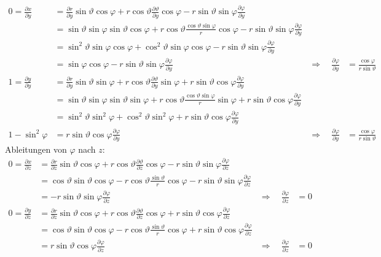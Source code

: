 \begin{align*}
0=\frac{\partial x}{\partial y}
&=
\frac{\partial r}{\partial y}
\sin\vartheta\cos\varphi
+
r\cos\vartheta
\frac{\partial\vartheta}{\partial y}
\cos\varphi
-
r\sin\vartheta\sin\varphi
\frac{\partial\varphi}{\partial y}
\\
&=
\sin\vartheta\sin\varphi
\sin\vartheta\cos\varphi
+
r\cos\vartheta
\frac{\cos\vartheta\sin\varphi}{r}
\cos\varphi
-
r\sin\vartheta\sin\varphi
\frac{\partial\varphi}{\partial y}
\\
&=
\sin^2\vartheta \sin\varphi \cos\varphi
+
\cos^2\vartheta \sin\varphi \cos\varphi
-
r\sin\vartheta\sin\varphi
\frac{\partial\varphi}{\partial y}
\\
&=
\sin\varphi \cos\varphi
-
r\sin\vartheta\sin\varphi
\frac{\partial\varphi}{\partial y}
&\Rightarrow\quad
\frac{\partial\varphi}{\partial y}
&=
\frac{\cos\varphi}{r\sin\vartheta}
\\
1=\frac{\partial y}{\partial y}
&=
\frac{\partial r}{\partial y}
\sin\vartheta \sin\varphi
+
r\cos\vartheta
\frac{\partial\vartheta}{\partial y}
\sin\varphi
+
r\sin\vartheta\cos\varphi
\frac{\partial\varphi}{\partial y}
\\
&=
\sin\vartheta \sin\varphi
\sin\vartheta \sin\varphi
+
r\cos\vartheta
\frac{\cos\vartheta\sin\varphi}{r}
\sin\varphi
+
r\sin\vartheta\cos\varphi
\frac{\partial\varphi}{\partial y}
\\
&=
\sin^2\vartheta \sin^2\varphi
+
\cos^2\vartheta
\sin^2\varphi
+
r\sin\vartheta\cos\varphi
\frac{\partial\varphi}{\partial y}
\\
1-
\sin^2\varphi
&=
r\sin\vartheta\cos\varphi
\frac{\partial\varphi}{\partial y}
&
\Rightarrow\quad
\frac{\partial\varphi}{\partial y}
&=
\frac{\cos\varphi}{r\sin\vartheta}
\end{align*}
Ableitungen von $\varphi$ nach $z$:
\begin{align*}
0=\frac{\partial x}{\partial z}
&=
\frac{\partial r}{\partial z}
\sin\vartheta\cos\varphi
+
r\cos\vartheta
\frac{\partial\vartheta}{\partial z}
\cos\varphi
-
r\sin\vartheta\sin\varphi
\frac{\partial\varphi}{\partial z}
\\
&=
\cos\vartheta
\sin\vartheta\cos\varphi
-
r\cos\vartheta
\frac{\sin\vartheta}{r}
\cos\varphi
-
r\sin\vartheta\sin\varphi
\frac{\partial\varphi}{\partial z}
\\
&=
-
r\sin\vartheta\sin\varphi
\frac{\partial\varphi}{\partial z}
&\Rightarrow\quad
\frac{\partial\varphi}{\partial z}
&=0
\\
0=\frac{\partial y}{\partial z}
&=
\frac{\partial r}{\partial z}
\sin\vartheta\cos\varphi
+
r\cos\vartheta
\frac{\partial\vartheta}{\partial z}
\cos\varphi
+
r\sin\vartheta\cos\varphi
\frac{\partial\varphi}{\partial z}
\\
&=
\cos\vartheta
\sin\vartheta\cos\varphi
-
r\cos\vartheta
\frac{\sin\vartheta}{r}
\cos\varphi
+
r\sin\vartheta\cos\varphi
\frac{\partial\varphi}{\partial z}
\\
&=
r\sin\vartheta\cos\varphi
\frac{\partial\varphi}{\partial z}
&\Rightarrow\quad
\frac{\partial\varphi}{\partial z}
&=0
\end{align*}

